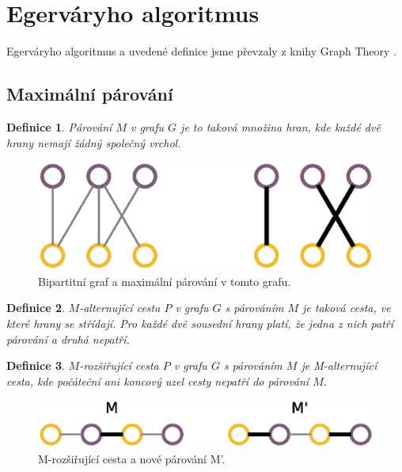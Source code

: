 \documentclass[a4paper, 11pt, titlepage, final]{article}[3. prosinec 2011]
\newtheorem{Definice}{Definice}
\begin{document}
\section{Egerváryho algoritmus} \label{secEgervary}

Egerváryho algoritmus a uvedené definice jsme převzaly z knihy Graph Theory \cite{bondy:2008}.

\subsection{Maximální párování}

\begin{Definice}
\textit{Párování} $M$ v grafu $G$ je to taková množina hran, kde každé dvě hrany nemají žádný společný vrchol.
\end{Definice}

\begin{figure}[ht]
  \centering
  \includegraphics[scale=0.5]{img/bipartite.eps}
  \caption{Bipartitní graf a maximální párování v tomto grafu.}
  \label{imgBipartite}
\end{figure}


\begin{Definice}
\textit{$M$-alternující cesta} $P$ v grafu $G$ s párováním $M$ je taková cesta, ve které hrany se střídají. Pro každé dvě sousední hrany platí, že jedna z nich patří párování a druhá nepatří.
\end{Definice}

\begin{Definice}
\textit{$M$-rozšiřující cesta} $P$ v grafu $G$ s párováním $M$ je M-alternující cesta, kde počáteční ani koncový uzel cesty nepatří do párování $M$.
\end{Definice}

\begin{figure}[ht]
  \centering
  \includegraphics[scale=0.5]{img/mpath.eps}
  \caption{M-rozšiřující cesta a nové párování M'.}
  \label{imgPath}
\end{figure}
\end{document}
